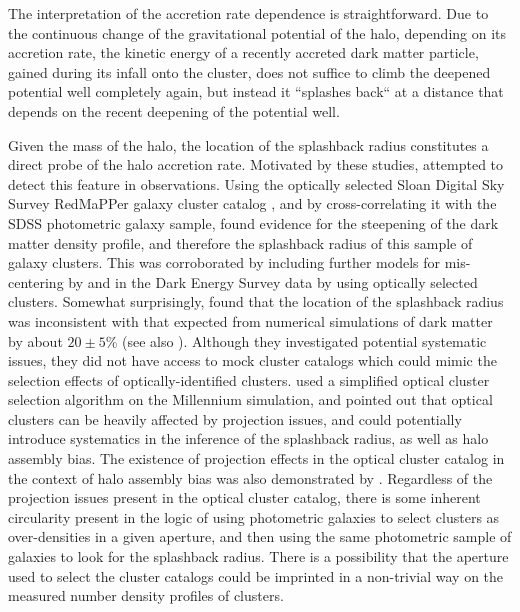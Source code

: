 \documentclass[iop, apjl, twocolappendix, numberedappendix]{emulateapj}
\begin{document}
The interpretation of the accretion rate dependence is
straightforward. Due to the continuous change of the gravitational
potential of the halo, depending on its accretion rate, the kinetic
energy of a recently accreted dark matter particle, gained during
its infall onto the cluster, does not suffice to climb the deepened
potential well completely again, but instead it ``splashes back`` at
a distance that depends on the recent deepening of the potential
well.

Given the mass of the halo, the location of the splashback radius
constitutes a direct probe of the halo accretion rate. Motivated by
these studies, \citet{more2016detection} attempted to detect this
feature in observations. Using the optically selected Sloan Digital
Sky Survey RedMaPPer galaxy cluster catalog
\citep{rykoff2014redmapper}, and by cross-correlating it with the
SDSS photometric galaxy sample, \citet{more2016detection} found evidence
for the steepening of the dark matter density profile, and therefore
the splashback radius of this sample of galaxy clusters. This was
corroborated by including further models for mis-centering by
\citet{baxter2017halo} and in the Dark Energy Survey data by
\citet{chang2017splashback} using optically selected clusters. Somewhat surprisingly,
\citet{more2016detection} found that the location of the splashback radius was
inconsistent with that expected from numerical simulations of dark matter by
about $20\pm5$\% (see also \citet{baxter2017halo, chang2017splashback}).
Although they
investigated potential systematic issues, they did not have access
to mock cluster catalogs which could mimic the selection effects of
optically-identified clusters. \citet{busch2017assembly} used a
simplified optical cluster selection algorithm on the Millennium
simulation, and pointed out that optical clusters can be heavily
affected by projection issues, and could potentially introduce
systematics in the inference of the splashback radius, as well as
halo assembly bias. The existence of projection effects in the
optical cluster catalog in the context of halo assembly bias was
also demonstrated by \citet{zu2016level}. Regardless of the
projection issues present in the optical cluster catalog, there is some
inherent circularity present in the logic of using photometric galaxies to
select clusters as over-densities in a given aperture, and then using the same
photometric sample of galaxies to look for the splashback radius. There is a
possibility that the aperture used to select the cluster catalogs could be
imprinted in a non-trivial way on the measured number density profiles of
clusters.
\end{document}
